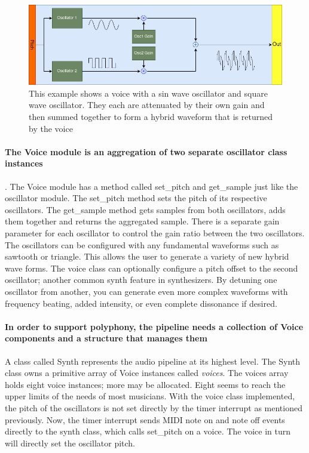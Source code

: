 \documentclass[acmlarge,screen]{acmart}
\begin{document}
	\begin{figure}[H]
		\includegraphics[width=\linewidth]{simple_voice}
		\caption{This example shows a voice with a sin wave oscillator and square wave oscillator. They each are attenuated by their own gain and then summed together to form a hybrid waveform that is returned by the voice}
		\centering
	\end{figure}
	
	\paragraph{The Voice module is an aggregation of two separate oscillator class instances}. The Voice module has a method called set\_pitch and get\_sample just like the oscillator module. The set\_pitch method sets the pitch of its respective oscillators. The get\_sample method gets samples from both oscillators, adds them together and returns the aggregated sample. There is a separate gain parameter for each oscillator to control the gain ratio between the two oscillators. The oscillators can be configured with any fundamental waveforms such as sawtooth or triangle. This allows the user to generate a variety of new hybrid wave forms. The voice class can optionally configure a pitch offset to the second oscillator; another common synth feature in synthesizers. By detuning one oscillator from another, you can generate even more complex waveforms with frequency beating, added intensity, or even complete dissonance if desired.
	
	
	
	\paragraph{In order to support polyphony, the pipeline needs a collection of Voice components and a structure that manages them} A class called Synth represents the audio pipeline at its highest level. The Synth class owns a primitive array of Voice instances called \textit{voices}. The voices array holds eight voice instances; more may be allocated. Eight seems to reach the upper limits of the needs of most musicians. With the voice class implemented, the pitch of the oscillators is not set directly by the timer interrupt as mentioned previously. Now, the timer interrupt sends MIDI note on and note off events directly to the synth class, which calls set\_pitch on a voice. The voice in turn will directly set the oscillator pitch.
	
\end{document}
